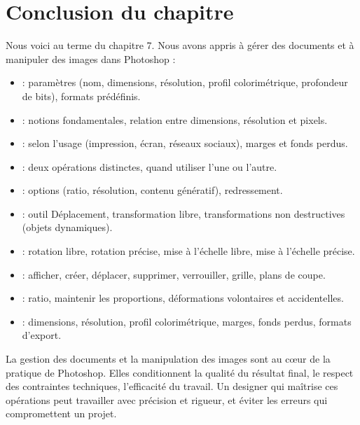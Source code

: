 \section*{Conclusion du chapitre}

Nous voici au terme du chapitre 7. Nous avons appris à gérer des documents et à manipuler des images dans Photoshop :

\begin{itemize}
    \item {} : paramètres (nom, dimensions, résolution, profil colorimétrique, profondeur de bits), formats prédéfinis.
    \item {} : notions fondamentales, relation entre dimensions, résolution et pixels.
    \item {} : selon l'usage (impression, écran, réseaux sociaux), marges et fonds perdus.
    \item {} : deux opérations distinctes, quand utiliser l'une ou l'autre.
    \item {} : options (ratio, résolution, contenu génératif), redressement.
    \item {} : outil Déplacement, transformation libre, transformations non destructives (objets dynamiques).
    \item {} : rotation libre, rotation précise, mise à l'échelle libre, mise à l'échelle précise.
    \item {} : afficher, créer, déplacer, supprimer, verrouiller, grille, plans de coupe.
    \item {} : ratio, maintenir les proportions, déformations volontaires et accidentelles.
    \item {} : dimensions, résolution, profil colorimétrique, marges, fonds perdus, formats d'export.
\end{itemize}

La gestion des documents et la manipulation des images sont au cœur de la pratique de Photoshop. Elles conditionnent la qualité du résultat final, le respect des contraintes techniques, l'efficacité du travail. Un designer qui maîtrise ces opérations peut travailler avec précision et rigueur, et éviter les erreurs qui compromettent un projet.

